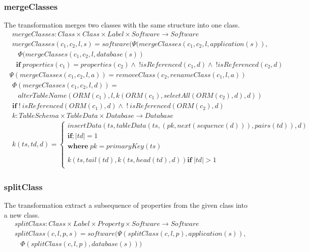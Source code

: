 \documentclass[10pt]{article}
\begin{document}
\subsubsection{mergeClasses}
The transformation merges two classes with the same structure into one class.
\begin{align}
& mergeClasses: Class \times Class \times Label \times Software  \rightarrow Software \\
& mergeClasses(c_1, c_2, l, s) = software(\Psi(mergeClasses(c_1, c_2, l, application(s)), \nonumber \\
& \;\;\; \Phi(mergeClasses(c_1, c_2, l, database(s)) \nonumber \\
& \;\; \mathbf{if} \; properties(c_1) = properties(c_2) \land \; !isReferenced(c_1, d) \land  \; !isReferenced(c_2, d)
\end{align}
\begin{align}
\Psi(mergeClasses(c_1, c_2, l, a)) = removeClass(c_2, renameClass(c_1, l, a))
\end{align}
\begin{align}
& \Phi(mergeClasses(c_1, c_2, l, d)) = \nonumber \\
& \;\;\; alterTableName(ORM(c_1), l, k(ORM(c_1), selectAll(ORM(c_2), d), d)) \nonumber \\
&  \mathbf{if} \; !\:isReferenced(ORM(c_1), d) \land \; !\:isReferenced(ORM(c_2), d) 
\end{align}
\begin{align}
& k: TableSchema \times TableData \times Database \rightarrow Database \\
& k(ts, td, d) = \begin{cases}
 insertData(ts, tableData(ts, (pk, next(sequence(d))) , pairs(td)) , d) \\
 \mathbf{if}; |td| = 1 \\
 \mathbf{where} \; pk = primaryKey(ts) 
 \\\\
 k(ts, tail(td), k(ts, head(td), d))
  \mathbf{if} \; |td| > 1 \\
 \end{cases}
\end{align}



\subsubsection{splitClass}
The transformation extract a subsequence of properties from the given class into a new class. 
\begin{align}
& splitClass: Class \times Label \times Property \times Software \rightarrow Software \\
& splitClass(c, l, p, s) = software(\Psi(splitClass(c, l, p), application(s)), \nonumber \\
& \;\;\; \Phi(splitClass(c, l, p), database(s)))
\end{align}
\end{document}
